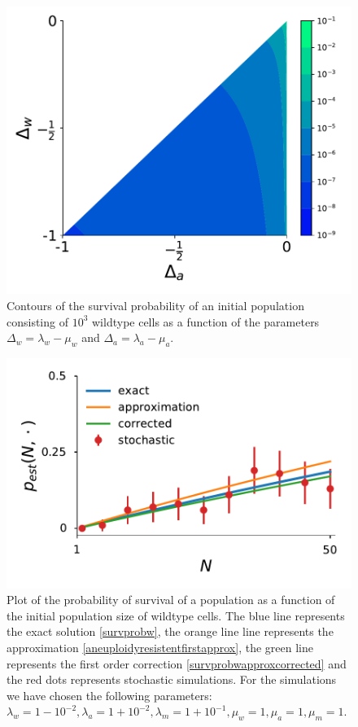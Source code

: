 \documentclass[12pt]{extarticle}
\begin{document}
\begin{figure}[!t]
 \vspace*{1\baselineskip}
\includegraphics[width=1\textwidth]{Figures/HeatMap_p_est.pdf}
\caption{Contours of the survival probability of an initial population consisting of $10^{3}$ wildtype cells as a function of the
   parameters $\Delta_w=\lambda_w-\mu_w$ and $\Delta_a=\lambda_a-\mu_a$.}
\label{SurvHeatMapPlot}
\end{figure}

\begin{figure}[!t]
 \vspace*{1\baselineskip}
\includegraphics[width=1\textwidth]{Figures/SurvPlotNData.pdf}
\caption{Plot of the probability of survival of a population as a function of the initial population size of wildtype cells. The blue line represents the exact solution \eqref{survprobw}, the orange line line represents the approximation \eqref{aneuploidyresistentfirstapprox}, the green line represents the first order correction \eqref{survprobwapproxcorrected} and the red dots represents stochastic simulations. For the simulations we have chosen the following parameters: $\lambda_w=1-10^{-2}, \lambda_a=1+10^{-2},\lambda_m=1+10^{-1},\mu_w=1,\mu_a=1,\mu_m=1.$}
\label{SurvPlotNData}
\end{figure}
\end{document}
